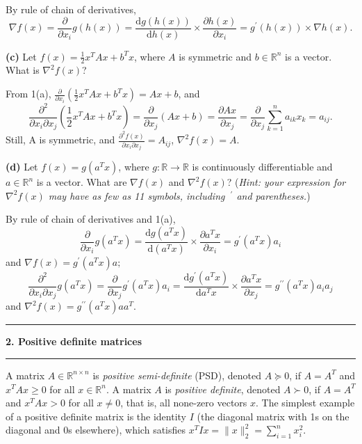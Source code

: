 \documentclass[11pt]{article}
\newcommand\question[2]{\vspace{.25in}\hrule\textbf{#1. #2}\vspace{.5em}\hrule\vspace{.10in}}
\renewcommand\part[1]{\vspace{.10in}\textbf{(#1)  }}
\begin{document}
By rule of chain of derivatives, $$\nabla f(x) = \frac{\partial}{\partial x_i} g(h(x)) = \frac{\text{d}g(h(x))}{\text{d}h(x)}\times \frac{\partial h(x)}{\partial x_i} = g^\prime(h(x))\times \nabla h(x).$$

\part{c}Let $f(x)=\frac{1}{2}x^TAx + b^Tx$, where $A$ is symmetric and $b\in \mathbb{R}^n$ is a vector. What is $\nabla^2 f(x)$?

From 1(a), $\frac{\partial}{\partial x_i}\left(\frac{1}{2}x^TAx + b^Tx\right) = Ax+b$, and $$\frac{\partial^2}{\partial x_i\partial x_j}\left(\frac{1}{2}x^TAx + b^Tx\right) = \frac{\partial}{\partial x_j}(Ax+b)= \frac{\partial Ax}{\partial x_j} = \frac{\partial}{\partial x_j}\sum_{k=1}^{n}a_{ik}x_k = a_{ij}.$$
Still, A is symmetric, and $\frac{\partial^2f(x)}{\partial x_i\partial x_j} = A_{ij}$, $\nabla^2 f(x) = A$.

\part{d}Let $f(x)=g(a^Tx)$, where $g: \mathbb{R} \rightarrow \mathbb{R}$ is continuously differentiable and $a\in \mathbb{R}^n$ is a vector. What are $\nabla f(x)$ and $\nabla^2 f(x)$? (\textit{Hint: your expression for $\nabla^2 f(x)$ may have as few as 11 symbols, including $~^\prime$ and parentheses.})

By rule of chain of derivatives and 1(a), $$\frac{\partial}{\partial x_i} g(a^Tx) = \frac{\text{d}g(a^Tx)}{\text{d}(a^Tx)}\times \frac{\partial a^Tx}{\partial x_i} = g^{\prime}(a^Tx)a_i$$
and $\nabla f(x) = g^{\prime}(a^Tx)a;$
$$\frac{\partial^2}{\partial x_i \partial x_j} g(a^Tx) = \frac{\partial}{\partial x_j}g^{\prime}(a^Tx)a_i = \frac{\text{d}g^\prime (a^Tx)}{\text{d}a^Tx}\times \frac{\partial a^Tx}{\partial x_j} = g^{\prime\prime}(a^Tx)a_ia_j$$
and $\nabla^2 f(x) = g^{\prime\prime}(a^Tx)aa^T.$

\question{2}{Positive definite matrices}
A matrix $A \in \mathbb{R}^{n \times n}$ is \emph{positive semi-definite} (PSD), denoted $A\succeq 0$, if $A = A^T$ and $x^TAx \geq 0$ for all $x \in \mathbb{R}^n$. A matrix $A$ is \emph{positive definite}, denoted $A\succ 0$, if $A = A^T$ and $x^TAx > 0$ for all $x \neq 0$, that is, all none-zero vectors $x$. The simplest example of a positive definite matrix is the identity $I$ (the diagonal matrix with 1s on the diagonal and 0s elsewhere), which satisfies $x^TIx = \|x\|_2^2= \sum_{i = 1}^{n}x_i^2$.
\end{document}
